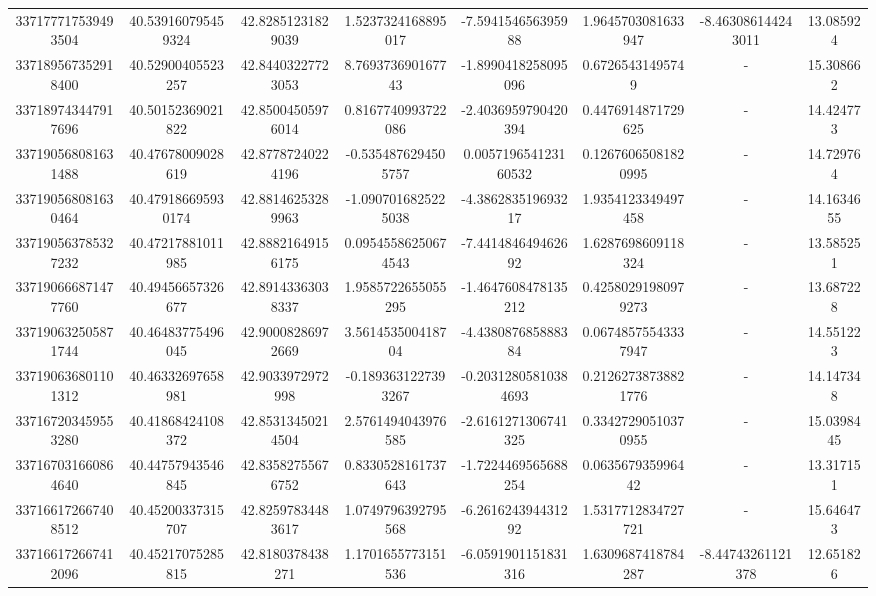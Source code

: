 \documentclass{article}
\begin{document}
\begin{landscape}
\begin{longtable}[c]{S[table-format=18.0]S[table-format=2.15]S[table-format=2.15]S[table-format=-2.17]S[table-format=-2.16]S[table-format=-2.16]S[table-format=-3.16]S[table-format=2.7]}
337177717539493504 & 40.539160795459324 & 42.82851231829039  & 1.5237324168895017    & -7.594154656395988   & 1.9645703081633947   & -8.463086144243011  & 13.085924  \\
337189567352918400 & 40.52900405523257  & 42.84403227723053  & 8.769373690167743     & -1.8990418258095096  & 0.67265431495749     & {-}                  & 15.308662  \\
337189743447917696 & 40.50152369021822  & 42.85004505976014  & 0.8167740993722086    & -2.4036959790420394  & 0.4476914871729625   & {-}                  & 14.424773  \\
337190568081631488 & 40.47678009028619  & 42.87787240224196  & -0.5354876294505757   & 0.005719654123160532 & 0.12676065081820995  & {-}                  & 14.729764  \\
337190568081630464 & 40.479186695930174 & 42.88146253289963  & -1.0907016825225038   & -4.386283519693217   & 1.9354123349497458   & {-}                  & 14.1634655 \\
337190563785327232 & 40.47217881011985  & 42.88821649156175  & 0.09545586250674543   & -7.441484649462692   & 1.6287698609118324   & {-}                  & 13.585251  \\
337190666871477760 & 40.49456657326677  & 42.89143363038337  & 1.9585722655055295    & -1.4647608478135212  & 0.42580291980979273  & {-}                  & 13.687228  \\
337190632505871744 & 40.46483775496045  & 42.90008286972669  & 3.561453500418704     & -4.438087685888384   & 0.06748575543337947  & {-}                  & 14.551223  \\
337190636801101312 & 40.46332697658981  & 42.9033972972998   & -0.1893631227393267   & -0.20312805810384693 & 0.21262738738821776  & {-}                  & 14.147348  \\
337167203459553280 & 40.41868424108372  & 42.85313450214504  & 2.5761494043976585    & -2.6161271306741325  & 0.33427290510370955  & {-}                  & 15.0398445 \\
337167031660864640 & 40.44757943546845  & 42.83582755676752  & 0.8330528161737643    & -1.7224469565688254  & 0.063567935996442    & {-}                  & 13.317151  \\
337166172667408512 & 40.45200337315707  & 42.82597834483617  & 1.0749796392795568    & -6.261624394431292   & 1.5317712834727721   & {-}                  & 15.646473  \\
337166172667412096 & 40.45217075285815  & 42.8180378438271   & 1.1701655773151536    & -6.0591901151831316  & 1.6309687418784287   & -8.44743261121378   & 12.651826  \\

\end{longtable}
\end{landscape}
\end{document}
